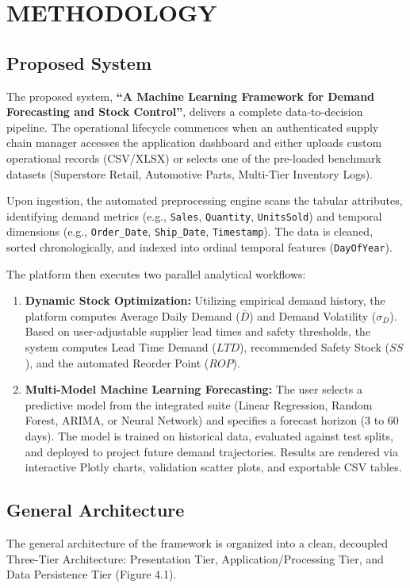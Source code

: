 \documentclass[12pt,a4paper]{report}
\begin{document}
\newpage
\chapter{METHODOLOGY}

\section{Proposed System}
The proposed system, \textbf{``A Machine Learning Framework for Demand Forecasting and Stock Control''}, delivers a complete data-to-decision pipeline. The operational lifecycle commences when an authenticated supply chain manager accesses the application dashboard and either uploads custom operational records (CSV/XLSX) or selects one of the pre-loaded benchmark datasets (Superstore Retail, Automotive Parts, Multi-Tier Inventory Logs).

Upon ingestion, the automated preprocessing engine scans the tabular attributes, identifying demand metrics (e.g., \texttt{Sales}, \texttt{Quantity}, \texttt{UnitsSold}) and temporal dimensions (e.g., \texttt{Order\_Date}, \texttt{Ship\_Date}, \texttt{Timestamp}). The data is cleaned, sorted chronologically, and indexed into ordinal temporal features (\texttt{DayOfYear}).

The platform then executes two parallel analytical workflows:
\begin{enumerate}
    \item \textbf{Dynamic Stock Optimization:} Utilizing empirical demand history, the platform computes Average Daily Demand ($\bar{D}$) and Demand Volatility ($\sigma_D$). Based on user-adjustable supplier lead times and safety thresholds, the system computes Lead Time Demand ($LTD$), recommended Safety Stock ($SS$), and the automated Reorder Point ($ROP$).
    \item \textbf{Multi-Model Machine Learning Forecasting:} The user selects a predictive model from the integrated suite (Linear Regression, Random Forest, ARIMA, or Neural Network) and specifies a forecast horizon (3 to 60 days). The model is trained on historical data, evaluated against test splits, and deployed to project future demand trajectories. Results are rendered via interactive Plotly charts, validation scatter plots, and exportable CSV tables.
\end{enumerate}

\section{General Architecture}
The general architecture of the framework is organized into a clean, decoupled Three-Tier Architecture: Presentation Tier, Application/Processing Tier, and Data Persistence Tier (Figure 4.1).
\end{document}
